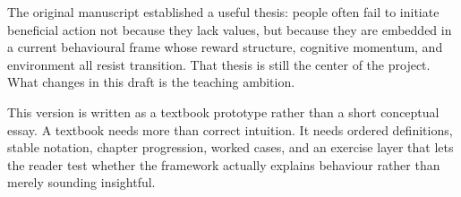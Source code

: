 The original manuscript established a useful thesis: people often fail to
initiate beneficial action not because they lack values, but because they are
embedded in a current behavioural frame whose reward structure, cognitive
momentum, and environment all resist transition. That thesis is still the
center of the project. What changes in this draft is the teaching ambition.

This version is written as a textbook prototype rather than a short conceptual
essay. A textbook needs more than correct intuition. It needs ordered
definitions, stable notation, chapter progression, worked cases, and an
exercise layer that lets the reader test whether the framework actually
explains behaviour rather than merely sounding insightful.
